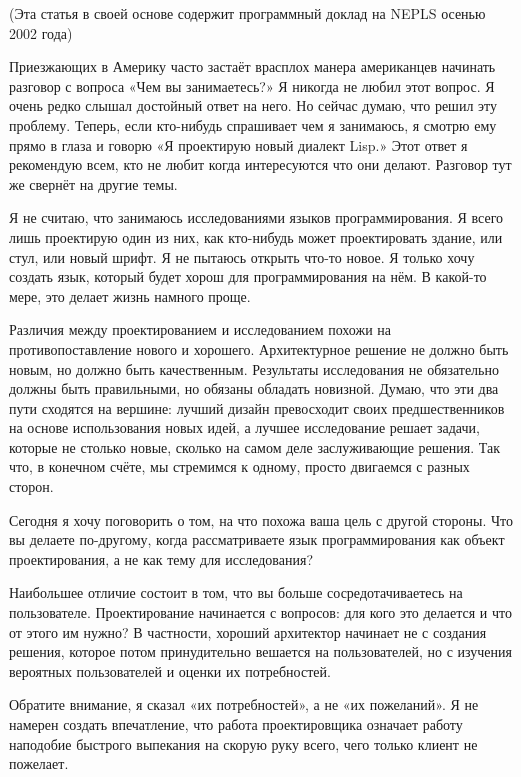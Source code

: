 \documentclass[ebook,12pt,oneside,openany]{memoir}
\begin{document}
\maketitle


(Эта статья в своей основе содержит программный доклад на NEPLS осенью
2002 года)

Приезжающих в Америку часто застаёт врасплох манера американцев
начинать разговор с вопроса «Чем вы занимаетесь?» Я никогда не любил
этот вопрос. Я очень редко слышал достойный ответ на него. Но сейчас
думаю, что решил эту проблему. Теперь, если кто-нибудь спрашивает чем
я занимаюсь, я смотрю ему прямо в глаза и говорю «Я проектирую новый
диалект Lisp.» Этот ответ я рекомендую всем, кто не любит когда
интересуются что они делают. Разговор тут же свернёт на другие темы.

Я не считаю, что занимаюсь исследованиями языков программирования. Я
всего лишь проектирую один из них, как кто-нибудь может проектировать
здание, или стул, или новый шрифт. Я не пытаюсь открыть что-то новое.
Я только хочу создать язык, который будет хорош для программирования
на нём. В какой-то мере, это делает жизнь намного проще.

Различия между проектированием и исследованием похожи на
противопоставление нового и хорошего. Архитектурное решение не должно
быть новым, но должно быть качественным. Результаты исследования не
обязательно должны быть правильными, но обязаны обладать новизной.
Думаю, что эти два пути сходятся на вершине: лучший дизайн превосходит
своих предшественников на основе использования новых идей, а лучшее
исследование решает задачи, которые не столько новые, сколько на самом
деле заслуживающие решения. Так что, в конечном счёте, мы стремимся к
одному, просто двигаемся с разных сторон.

Сегодня я хочу поговорить о том, на что похожа ваша цель с другой
стороны. Что вы делаете по-другому, когда рассматриваете язык
программирования как объект проектирования, а не как тему для
исследования?

Наибольшее отличие состоит в том, что вы больше сосредотачиваетесь на
пользователе. Проектирование начинается с вопросов: для кого это
делается и что от этого им нужно? В частности, хороший архитектор
начинает не с создания решения, которое потом принудительно вешается
на пользователей, но с изучения вероятных пользователей и оценки их
потребностей.

Обратите внимание, я сказал «их потребностей», а не «их пожеланий». Я
не намерен создать впечатление, что работа проектировщика означает
работу наподобие быстрого выпекания на скорую руку всего, чего только
клиент не пожелает.
\end{document}
